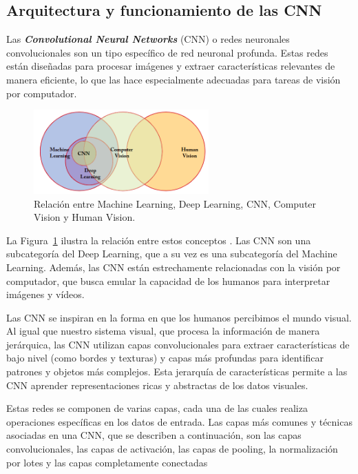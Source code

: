 \documentclass[11pt,spanish,listoffigures,listoftables]{tfgetsinf}
\begin{document}
\subsection{Arquitectura y funcionamiento de las CNN}
Las \textit{\textbf{Convolutional Neural Networks}} (CNN) o redes neuronales convolucionales son un tipo específico de red neuronal profunda. Estas redes están diseñadas para procesar imágenes y extraer características relevantes de manera eficiente, lo que las hace especialmente adecuadas para tareas de visión por computador.

\begin{figure}[H]
   \centering
   \includegraphics[width=0.6\textwidth]{images/estado_del_arte/diagrama_de_Venn_inteligencia_artificial.png}
   \caption{Relación entre Machine Learning, Deep Learning, CNN, Computer Vision y Human Vision.}
   \label{fig:diagrama_de_Venn_inteligencia_artificial}
\end{figure}

La Figura~\ref{fig:diagrama_de_Venn_inteligencia_artificial} ilustra la relación entre estos conceptos \cite{khan2018guide}. Las CNN son una subcategoría del Deep Learning, que a su vez es una subcategoría del Machine Learning. Además, las CNN están estrechamente relacionadas con la visión por computador, que busca emular la capacidad de los humanos para interpretar imágenes y vídeos.

Las CNN se inspiran en la forma en que los humanos percibimos el mundo visual. Al igual que nuestro sistema visual, que procesa la información de manera jerárquica, las CNN utilizan capas convolucionales para extraer características de bajo nivel (como bordes y texturas) y capas más profundas para identificar patrones y objetos más complejos. Esta jerarquía de características permite a las CNN aprender representaciones ricas y abstractas de los datos visuales.

Estas redes se componen de varias capas, cada una de las cuales realiza operaciones específicas en los datos de entrada. Las capas más comunes y técnicas asociadas en una CNN, que se describen a continuación, son las capas convolucionales, las capas de activación, las capas de pooling, la normalización por lotes y las capas completamente conectadas
\end{document}
